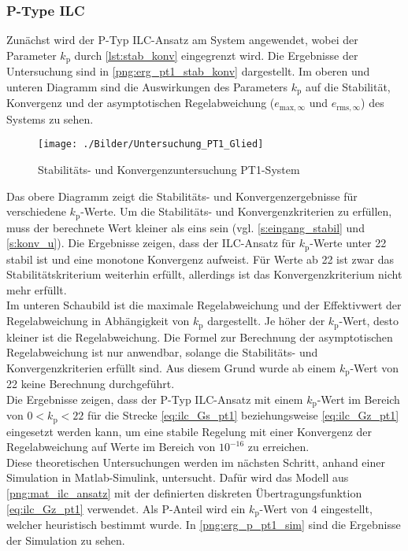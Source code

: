 \subsubsection{P-Type ILC}
\label{subsub:P_type}
Zunächst wird der P-Typ ILC-Ansatz am System angewendet, wobei der Parameter $k_\mathrm{p}$ durch \autoref{lst:stab_konv} eingegrenzt wird. Die Ergebnisse der Untersuchung sind in \autoref{png:erg_pt1_stab_konv} dargestellt. Im oberen und unteren Diagramm sind die Auswirkungen des Parameters $k_\mathrm{p}$ auf die Stabilität, Konvergenz und der asymptotischen Regelabweichung ($e_{\textrm{max},\infty}$ und $e_{\mathrm{rms},\infty}$) des Systems zu sehen.
\begin{figure}[H]
	\centering
	\texttt{[image: ./Bilder/Untersuchung\_PT1\_Glied]}
	\caption{Stabilitäts- und Konvergenzuntersuchung PT1-System}
	\label{png:erg_pt1_stab_konv}
\end{figure}
Das obere Diagramm zeigt die Stabilitäts- und Konvergenzergebnisse für verschiedene $k_\mathrm{p}$-Werte. Um die Stabilitäts- und Konvergenzkriterien zu erfüllen, muss der berechnete Wert kleiner als eins sein (vgl. \autoref{s:eingang_stabil} und \autoref{s:konv_u}). Die Ergebnisse zeigen, dass der ILC-Ansatz für $k_\mathrm{p}$-Werte unter 22 stabil ist und eine monotone Konvergenz aufweist. Für Werte ab 22 ist zwar das Stabilitätskriterium weiterhin erfüllt, allerdings ist das Konvergenzkriterium nicht mehr erfüllt.\\
Im unteren Schaubild ist die maximale Regelabweichung und der Effektivwert der Regelabweichung in Abhängigkeit von $k_\mathrm{p}$ dargestellt. Je höher der $k_\mathrm{p}$-Wert, desto kleiner ist die Regelabweichung. Die Formel zur Berechnung der asymptotischen Regelabweichung ist nur anwendbar, solange die Stabilitäts- und Konvergenzkriterien erfüllt sind. Aus diesem Grund wurde ab einem $k_\mathrm{p}$-Wert von 22 keine Berechnung durchgeführt.\\
Die Ergebnisse zeigen, dass der P-Typ ILC-Ansatz mit einem $k_\mathrm{p}$-Wert im Bereich von $0 < k_\mathrm{p} < 22$ für die Strecke \ref{eq:ilc_Gs_pt1} beziehungsweise \ref{eq:ilc_Gz_pt1} eingesetzt werden kann, um eine stabile Regelung mit einer Konvergenz der Regelabweichung auf Werte im Bereich von $10^{-16}$ zu erreichen.\\
Diese theoretischen Untersuchungen werden im nächsten Schritt, anhand einer Simulation in Matlab-Simulink, untersucht. Dafür wird das Modell aus \autoref{png:mat_ilc_ansatz} mit der definierten diskreten Übertragungsfunktion \ref{eq:ilc_Gz_pt1} verwendet. Als P-Anteil wird ein $k_\mathrm{p}$-Wert von 4 eingestellt, welcher heuristisch bestimmt wurde. In \autoref{png:erg_p_pt1_sim} sind die Ergebnisse der Simulation zu sehen.
